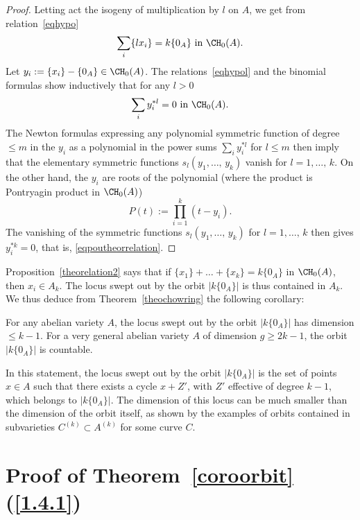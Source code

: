 \begin{proof}
Letting act the isogeny of multiplication by $l$ on $A$, we get from relation~\eqref{eqhypo}
\begin{equation}\label{eqhypol}
\sum_i\{lx_i\}=k\{0_A\}\text{ in }\CH_0(A).
\end{equation}
Let $y_i:=\{x_i\}-\{0_A\}\in\CH_0(A)$. The relations~\eqref{eqhypol} and the binomial formulas show inductively that for any $l>0$
\begin{equation}\label{eqhypoly}
\sum_iy_i^{*l}=0 \text{ in }\CH_0(A).
\end{equation}
The Newton formulas expressing any polynomial symmetric function of degree $\leq m$ in the $y_i$ as a polynomial in the power sums $\sum_iy_i^{*l}$ for $l\leq m$ then imply that the elementary symmetric functions $s_l(y_1,\dots,\,y_k)$ vanish for $l=1,\dots,\,k$. On the other hand, the $y_i$ are roots of the polynomial (where the product is Pontryagin product in $\CH_0(A)$)
\[
P(t):=\prod_{i=1}^k (t-y_i).
\]
The vanishing of the symmetric functions $s_l(y_1,\dots,\,y_k)$ for $l=1,\dots,\,k$ then gives $y_i^{*k}=0$, that is, \eqref{eqpoutheorrelation}.
\end{proof}

Proposition~\ref{theorelation2} says that if $\{x_1\}+\dots+\{x_k\}=k\{0_A\}$ in $\CH_0(A)$, then $x_i\in A_k$. The locus swept out by the orbit $|k\{0_A\}|$ is thus contained in $A_k$. We thus deduce from Theorem~\ref{theochowring} the following corollary:

\begin{coro}
For any abelian variety $A$, the locus swept out by the orbit $|k\{0_A\}|$ has dimension $\leq k-1$. For a very general abelian variety $A$ of dimension $g\geq 2k-1$, the orbit $|k\{0_A\}|$ is countable.
\end{coro}

In this statement, the locus swept out by the orbit $|k\{0_A\}|$ is the set of points $x\in A$ such that there exists a cycle $x+Z'$, with $Z'$ effective of degree $k-1$, which belongs to $|k\{0_A\}|$. The dimension of this locus can be much smaller than the dimension of the orbit itself, as shown by the examples of orbits contained in subvarieties $C^{(k)}\subset A^{(k)}$ for some curve $C$.


\section{Proof of Theorem~\ref{coroorbit}\tMK(\ref{1.4.1})}\label{secdimorbit}

